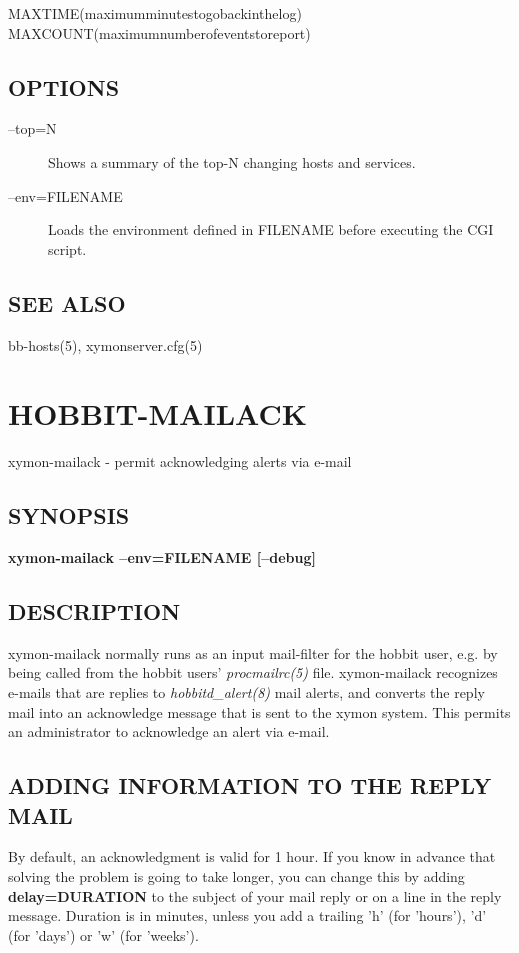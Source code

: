   
MAXTIME(maximumminutestogobackinthelog)  
MAXCOUNT(maximumnumberofeventstoreport) 


 
\subsection{OPTIONS}
\begin{description}
\item[--top=N] Shows a summary of the top-N changing hosts and services. 

 

\item[--env=FILENAME] Loads the environment defined in FILENAME before executing the CGI script. 

 


\end{description}
\subsection{SEE ALSO}
bb-hosts(5), xymonserver.cfg(5) 

%
%
\newpage
\section{HOBBIT-MAILACK}

 xymon-mailack - permit acknowledging alerts via e-mail \subsection{SYNOPSIS}
\textbf{xymon-mailack --env=FILENAME [--debug]}


 
\subsection{DESCRIPTION}
 xymon-mailack normally runs as an input mail-filter for the hobbit user, e.g. by being called from the hobbit users' \emph{procmailrc(5)}
 file. xymon-mailack recognizes e-mails that are replies to \emph{hobbitd\_alert(8)}
 mail alerts, and converts the reply mail into an acknowledge message that is sent to the xymon system. This permits an administrator to acknowledge an alert via e-mail. 

 
\subsection{ADDING INFORMATION TO THE REPLY MAIL}
 By default, an acknowledgment is valid for 1 hour. If you know in advance that solving the problem is going to take longer, you can change this by adding \textbf{delay=DURATION}
 to the subject of your mail reply or on a line in the reply message. Duration is in minutes, unless you add a trailing 'h' (for 'hours'), 'd' (for 'days') or 'w' (for 'weeks'). 

